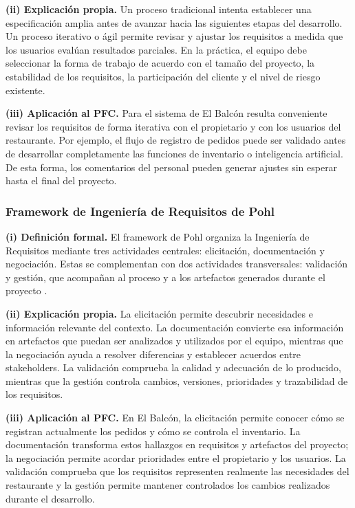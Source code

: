 \textbf{(ii) Explicación propia.}
Un proceso tradicional intenta establecer una especificación amplia antes de
avanzar hacia las siguientes etapas del desarrollo. Un proceso iterativo o
ágil permite revisar y ajustar los requisitos a medida que los usuarios
evalúan resultados parciales. En la práctica, el equipo debe seleccionar la
forma de trabajo de acuerdo con el tamaño del proyecto, la estabilidad de los
requisitos, la participación del cliente y el nivel de riesgo existente.

\textbf{(iii) Aplicación al PFC.}
Para el sistema de El Balcón resulta conveniente revisar los requisitos de
forma iterativa con el propietario y con los usuarios del restaurante. Por
ejemplo, el flujo de registro de pedidos puede ser validado antes de desarrollar
completamente las funciones de inventario o inteligencia artificial. De esta
forma, los comentarios del personal pueden generar ajustes sin esperar hasta
el final del proyecto.

\subsubsection{Framework de Ingeniería de Requisitos de Pohl}

\textbf{(i) Definición formal.}
El framework de Pohl organiza la Ingeniería de Requisitos mediante tres
actividades centrales: elicitación, documentación y negociación. Estas se
complementan con dos actividades transversales: validación y gestión, que
acompañan al proceso y a los artefactos generados durante el proyecto
\cite{pohl2025}.

\textbf{(ii) Explicación propia.}
La elicitación permite descubrir necesidades e información relevante del
contexto. La documentación convierte esa información en artefactos que puedan
ser analizados y utilizados por el equipo, mientras que la negociación ayuda
a resolver diferencias y establecer acuerdos entre stakeholders. La
validación comprueba la calidad y adecuación de lo producido, mientras que
la gestión controla cambios, versiones, prioridades y trazabilidad de los
requisitos.

\textbf{(iii) Aplicación al PFC.}
En El Balcón, la elicitación permite conocer cómo se registran actualmente
los pedidos y cómo se controla el inventario. La documentación transforma
estos hallazgos en requisitos y artefactos del proyecto; la negociación
permite acordar prioridades entre el propietario y los usuarios. La validación
comprueba que los requisitos representen realmente las necesidades del
restaurante y la gestión permite mantener controlados los cambios realizados
durante el desarrollo.

